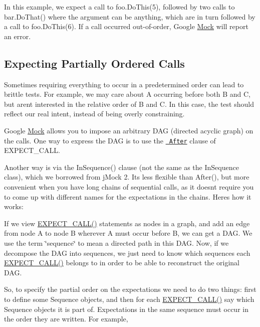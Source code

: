 In this example, we expect a call to {\ttfamily foo.\+Do\+This(5)}, followed by two calls to {\ttfamily bar.\+Do\+That()} where the argument can be anything, which are in turn followed by a call to {\ttfamily foo.\+Do\+This(6)}. If a call occurred out-\/of-\/order, Google \mbox{\hyperlink{class_mock}{Mock}} will report an error.

\subsection*{Expecting Partially Ordered Calls}

Sometimes requiring everything to occur in a predetermined order can lead to brittle tests. For example, we may care about {\ttfamily A} occurring before both {\ttfamily B} and {\ttfamily C}, but aren\textquotesingle{}t interested in the relative order of {\ttfamily B} and {\ttfamily C}. In this case, the test should reflect our real intent, instead of being overly constraining.

Google \mbox{\hyperlink{class_mock}{Mock}} allows you to impose an arbitrary D\+AG (directed acyclic graph) on the calls. One way to express the D\+AG is to use the \href{CheatSheet.md\#the-after-clause}{\texttt{ After}} clause of {\ttfamily E\+X\+P\+E\+C\+T\+\_\+\+C\+A\+LL}.

Another way is via the {\ttfamily In\+Sequence()} clause (not the same as the {\ttfamily In\+Sequence} class), which we borrowed from j\+Mock 2. It\textquotesingle{}s less flexible than {\ttfamily After()}, but more convenient when you have long chains of sequential calls, as it doesn\textquotesingle{}t require you to come up with different names for the expectations in the chains. Here\textquotesingle{}s how it works\+:

If we view {\ttfamily \mbox{\hyperlink{googletest-master_2googlemock_2include_2gmock_2gmock-spec-builders_8h_a535a6156de72c1a2e25a127e38ee5232}{E\+X\+P\+E\+C\+T\+\_\+\+C\+A\+L\+L()}}} statements as nodes in a graph, and add an edge from node A to node B wherever A must occur before B, we can get a D\+AG. We use the term \char`\"{}sequence\char`\"{} to mean a directed path in this D\+AG. Now, if we decompose the D\+AG into sequences, we just need to know which sequences each {\ttfamily \mbox{\hyperlink{googletest-master_2googlemock_2include_2gmock_2gmock-spec-builders_8h_a535a6156de72c1a2e25a127e38ee5232}{E\+X\+P\+E\+C\+T\+\_\+\+C\+A\+L\+L()}}} belongs to in order to be able to reconstruct the original D\+AG.

So, to specify the partial order on the expectations we need to do two things\+: first to define some {\ttfamily Sequence} objects, and then for each {\ttfamily \mbox{\hyperlink{googletest-master_2googlemock_2include_2gmock_2gmock-spec-builders_8h_a535a6156de72c1a2e25a127e38ee5232}{E\+X\+P\+E\+C\+T\+\_\+\+C\+A\+L\+L()}}} say which {\ttfamily Sequence} objects it is part of. Expectations in the same sequence must occur in the order they are written. For example,


